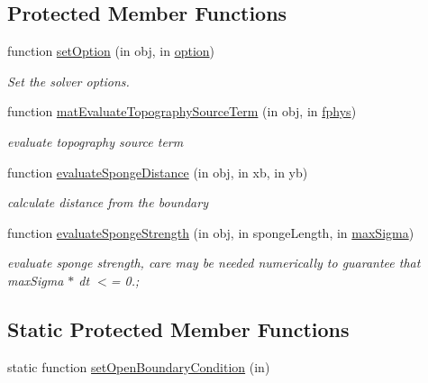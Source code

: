 \subsection*{Protected Member Functions}
\begin{DoxyCompactItemize}
\item 
function \hyperlink{class_closed_channel_sponge2d_af8573996bd1cb011975c3d06a7c196ea}{set\+Option} (in obj, in \hyperlink{class_ndg_phys_af91f4c54b93504e76b38a5693774dff1}{option})
\begin{DoxyCompactList}\small\item\em Set the solver options. \end{DoxyCompactList}\item 
function \hyperlink{class_closed_channel_sponge2d_a6c4946628fd7d9a94e5b91cfa882ffee}{mat\+Evaluate\+Topography\+Source\+Term} (in obj, in \hyperlink{class_ndg_phys_a6b25724fc9474d32018439009072f0a9}{fphys})
\begin{DoxyCompactList}\small\item\em evaluate topography source term \end{DoxyCompactList}\item 
function \hyperlink{class_closed_channel_sponge2d_a5e1e503844a7115b8a579d0028571934}{evaluate\+Sponge\+Distance} (in obj, in xb, in yb)
\begin{DoxyCompactList}\small\item\em calculate distance from the boundary \end{DoxyCompactList}\item 
function \hyperlink{class_closed_channel_sponge2d_a1d7ef85d2fee18f96cffeb661cc3ff5c}{evaluate\+Sponge\+Strength} (in obj, in sponge\+Length, in \hyperlink{class_closed_channel_sponge2d_acb222bffecc37c4266ae6cc6eb5441b0}{max\+Sigma})
\begin{DoxyCompactList}\small\item\em evaluate sponge strength, care may be needed numerically to guarantee that max\+Sigma $\ast$ dt $<$= 0.; \end{DoxyCompactList}\end{DoxyCompactItemize}
\subsection*{Static Protected Member Functions}
\begin{DoxyCompactItemize}
\item 
static function \hyperlink{class_closed_channel_sponge2d_a612a42bab1b9b8ca7730f4139243909d}{set\+Open\+Boundary\+Condition} (in)
\end{DoxyCompactItemize}
